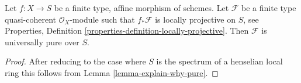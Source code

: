 \begin{lemma}
\label{lemma-affine-locally-projective-pure}
Let $f : X \to S$ be a finite type, affine morphism of schemes.
Let $\mathcal{F}$ be a finite type quasi-coherent $\mathcal{O}_X$-module
such that $f_*\mathcal{F}$ is locally projective on $S$, see
Properties, Definition \ref{properties-definition-locally-projective}.
Then $\mathcal{F}$ is universally pure over $S$.
\end{lemma}

\begin{proof}
After reducing to the case where $S$ is the spectrum of a henselian
local ring this follows from
Lemma \ref{lemma-explain-why-pure}.
\end{proof}
